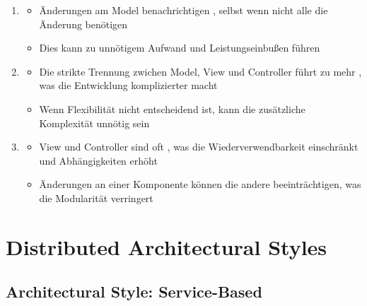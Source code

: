 \begin{infoBox}[title=Trade-offs von MVC]
    \begin{enumerate}
        \item {}
        \begin{itemize}
            \item {} Änderungen am Model benachrichtigen , selbst wenn nicht alle die Änderung benötigen
            \item {} Dies kann zu unnötigem Aufwand und Leistungseinbußen führen
        \end{itemize}
        \item {}
        \begin{itemize}
            \item {} Die strikte Trennung zwichen Model, View und Controller führt zu mehr , was die Entwicklung komplizierter macht
            \item {} Wenn Flexibilität nicht entscheidend ist, kann die zusätzliche Komplexität unnötig sein
        \end{itemize}
        \item {}
        \begin{itemize}
            \item {} View und Controller sind oft , was die Wiederverwendbarkeit einschränkt und Abhängigkeiten erhöht
            \item {} Änderungen an einer Komponente können die andere beeinträchtigen, was die Modularität verringert
        \end{itemize}
    \end{enumerate}
\end{infoBox}

\clearpage
\section{Distributed Architectural Styles}
\subsection{Architectural Style: Service-Based}
